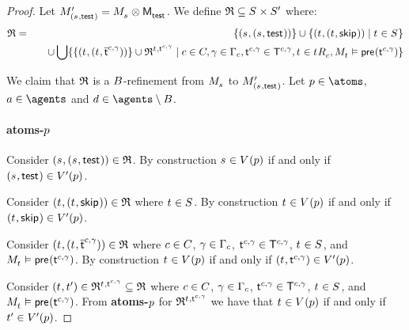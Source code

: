 \begin{proof}
Let $\kPModelP{(\kStateS, \aStateTest)} = \kPModel{\kStateS} \exec \aPModel{\aStateTest}$.
We define $\refinement \subseteq \kStates \times \kStatesP$ where:
\begin{eqnarray*}
\refinement &=& 
\{(\kStateS, (\kStateS, \aStateTest))\} \cup 
\{(\kStateT, (\kStateT, \aStateSkip)) \mid \kStateT \in \kStates\}  \\&&\quad \cup
\bigcup \{\{(\kStateT, (\kStateT, \aPStateT[\agentC, \gamma]))\} \cup \refinement^{\kStateT, \aStateT[\agentC, \gamma]} \mid \agentC \in \agentsC, \gamma \in \Gamma_\agentC, \aStateT[\agentC, \gamma] \in \aStatesT[\agentC, \gamma], \kStateT \in \kSuccessorsC{\kStateT}, \kPModel{\kStateT} \entails \aPrecondition(\aStateT[\agentC, \gamma])\}
\end{eqnarray*}

We claim that $\refinement$ is a $\agentsB$-refinement from $\kPModel{\kStateS}$ to $\kPModelP{(\kStateS, \aStateTest)}$.
Let $\atomP \in \atoms$, $\agentA \in \agents$ and $\agentD \in \agents \setminus \agentsB$.

\paragraph{atoms-$\atomP$}
Consider $(\kStateS, (\kStateS, \aStateTest)) \in \refinement$.
By construction $\kStateS \in \kValuation(\atomP)$ if and only if $(\kStateS, \aStateTest) \in \kValuationP(\atomP)$.

Consider $(\kStateT, (\kStateT, \aStateSkip)) \in \refinement$ where $\kStateT \in \kStates$.
By construction $\kStateT \in \kValuation(\atomP)$ if and only if $(\kStateT, \aStateSkip) \in \kValuationP(\atomP)$.

Consider $(\kStateT, (\kStateT, \aPStateT[\agentC, \gamma])) \in \refinement$ where $\agentC \in \agentsC$, $\gamma \in \Gamma_\agentC$, $\aStateT[\agentC, \gamma] \in \aStatesT[\agentC, \gamma]$, $\kStateT \in \kStates$, and $\kPModel{\kStateT} \entails \aPrecondition(\aStateT[\agentC, \gamma])$.
By construction $\kStateT \in \kValuation(\atomP)$ if and only if $(\kStateT, \aStateT[\agentC, \gamma]) \in \kValuationP(\atomP)$.

Consider $(\kStateT, \kStateTP) \in \refinement^{\kStateT, \aStateT[\agentC, \gamma]} \subseteq \refinement$ where $\agentC \in \agentsC$, $\gamma \in \Gamma_\agentC$, $\aStateT[\agentC, \gamma] \in \aStatesT[\agentC, \gamma]$, $\kStateT \in \kStates$, and $\kPModel{\kStateT} \entails \aPrecondition(\aStateT[\agentC, \gamma])$.
From {\bf atoms-$\atomP$} for $\refinement^{\kStateT, \aStateT[\agentC, \gamma]}$ we have that $\kStateT \in \kValuation(\atomP)$ if and only if $\kStateTP \in \kValuationP(\atomP)$.


\end{proof}
